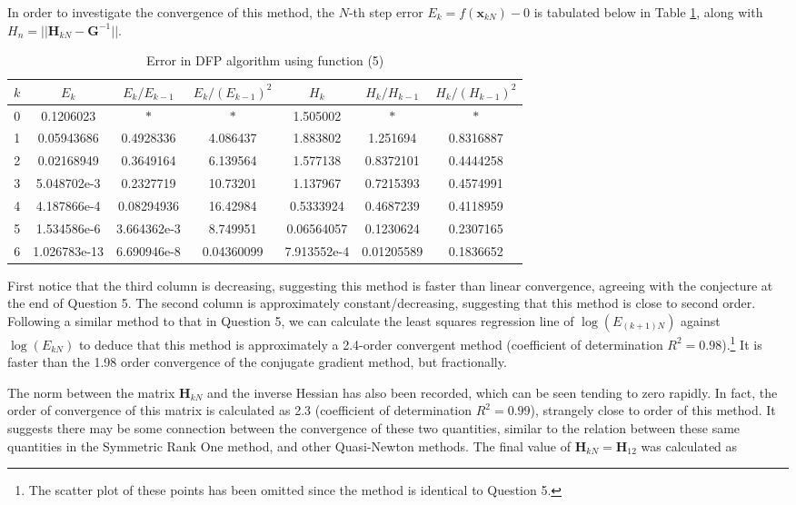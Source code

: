 \documentclass[10pt,a4paper,notitlepage]{article}
\newcommand{\abs}[1]{\lvert#1\rvert}
\newcommand{\x}{\mathbf{x}}
\newcommand{\h}{\mathbf{H}}
\newcommand{\G}{\mathbf{G}}
\begin{document}
In order to investigate the convergence of this method, the $N$-th step error $E_{k}=f(\x_{kN})-0$ is tabulated below in Table \ref{tb:7}, along with $H_{n}=\abs{\abs{\h_{kN}-\G^{-1}}}$.
\begin{table}[H]
\centering
\begin{tabular}{|c|ccc|ccc|} \hline $k$ & $E_{k}$ & $E_{k}/E_{k-1}$ & $E_{k}/(E_{k-1})^{2}$ & $H_{k}$ & $H_{k}/H_{k-1}$ & $H_{k}/(H_{k-1})^{2}$ \\ \hline 
0 & 0.1206023 & $\ast$ & $\ast$ & 1.505002 & $\ast$ & $\ast$ \\ 
1 & 0.05943686 & 0.4928336 & 4.086437 & 1.883802 & 1.251694 & 0.8316887\\ 
2 & 0.02168949 & 0.3649164 & 6.139564 & 1.577138 & 0.8372101 & 0.4444258\\ 
3 & 5.048702e-3 & 0.2327719 & 10.73201 & 1.137967 & 0.7215393 & 0.4574991\\ 
4 & 4.187866e-4 & 0.08294936 & 16.42984 & 0.5333924 & 0.4687239 & 0.4118959\\ 
5 & 1.534586e-6 & 3.664362e-3 & 8.749951 & 0.06564057 & 0.1230624 & 0.2307165\\ 
6 & 1.026783e-13 & 6.690946e-8 & 0.04360099 & 7.913552e-4 & 0.01205589 & 0.1836652\\ \hline \end{tabular}
\caption{Error in DFP algorithm using function (5)}\label{tb:7}
\end{table}
First notice that the third column is decreasing, suggesting this method is faster than linear convergence, agreeing with the conjecture at the end of Question 5. The second column is approximately constant/decreasing, suggesting that this method is close to second order. Following a similar method to that in Question 5, we can calculate the least squares regression line of $\log(E_{(k+1)N})$ against $\log(E_{kN})$ to deduce that this method is approximately a 2.4-order convergent method (coefficient of determination $R^{2}=0.98$).\footnote{The scatter plot of these points has been omitted since the method is identical to Question 5.} It is faster than the 1.98 order convergence of the conjugate gradient method, but fractionally.

The norm between the matrix $\h_{kN}$ and the inverse Hessian has also been recorded, which can be seen tending to zero rapidly. In fact, the order of convergence of this matrix is calculated as 2.3 (coefficient of determination $R^{2}=0.99$), strangely close to order of this method. It suggests there may be some connection between the convergence of these two quantities, similar to the relation between these same quantities in the Symmetric Rank One method, and other Quasi-Newton methods. The final value of $\h_{kN}=\h_{12}$ was calculated as 
\end{document}

